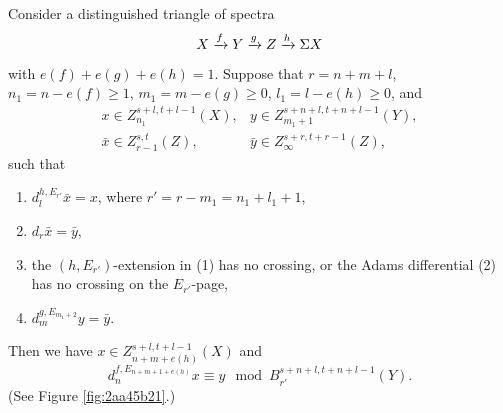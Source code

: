 \documentclass{amsart}
\numberwithin{equation}{section}
\begin{document}
\begin{theorem}\label{thm:158d451a} 
    Consider a distinguished triangle of spectra
    $$X\xrightarrow{f} Y\xrightarrow{g} Z\xrightarrow{h} \Sigma X$$
    with $e(f)+e(g)+e(h)=1$.
    Suppose that $r=n+m+l$, $n_1=n-e(f)\ge 1$, $m_1=m-e(g)\ge 0$, $l_1=l-e(h)\ge 0$, and
    $$\begin{array}{ll}
        x\in Z_{n_1}^{s+l,t+l-1}(X), & y\in Z_{m_1+1}^{s+n+l,t+n+l-1}(Y),\\
        \bar x\in Z_{r-1}^{s,t}(Z), & \bar y\in Z_\infty^{s+r,t+r-1}(Z),
    \end{array}$$
    such that
    \begin{enumerate}
        \item $d^{h,E_{r'}}_{l}\bar x=x$, where $r'=r-m_1=n_1+l_1+1$,
        \item $d_r \bar x=\bar y$,
            \item the $(h,E_{r'})$-extension in (1) has no crossing, or the Adams differential (2) has no crossing on the $E_{r'}$-page,
        \item $d^{g,E_{m_1+2}}_{m}y=\bar y$.
    \end{enumerate}
    Then we have $x\in Z_{n+m+e(h)}^{s+l,t+l-1}(X)$ and
    $$d^{f,E_{n+m+1+e(h)}}_{n}x\equiv y \mod B_{r'}^{s+n+l,t+n+l-1}(Y).$$
    (See Figure \ref{fig:2aa45b21}.)
\end{theorem}
\end{document}

